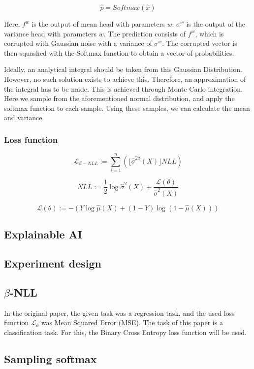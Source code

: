 \begin{equation}
    \hat{p} = Softmax(\hat{x})
\end{equation}

Here, $f^w$ is the output of mean head with parameters $w$. $\sigma^w$ is the output of the variance head with parameters $w$. The prediction consists of $f^w$, which is corrupted with Gaussian noise with a variance of $\sigma^w$. The corrupted vector is then squashed with the Softmax function to obtain a vector of probabilities.

Ideally, an analytical integral should be taken from this Gaussian Distribution. However, no such solution exists to achieve this. Therefore, an approximation of the integral has to be made. This is achieved through Monte Carlo integration. Here we sample from the aforementioned normal distribution, and apply the softmax function to each sample. Using these samples, we can calculate the mean and variance.


\subsubsection{Loss function}



\begin{equation}
    \mathcal{L}_{\beta-NLL} := \sum_{i = 1}^{n} \left( \lfloor \hat{\sigma}^{2\beta}(X) \rfloor NLL \right)
\end{equation}

\begin{equation}
    NLL := \frac{1}{2}\log \hat{\sigma}^2(X) + \frac{\mathcal{L}(\theta)}{\hat{\sigma}^2(X)}
\end{equation}

\begin{equation}
    \mathcal{L}(\theta) := - ( Y \log \hat{\mu}(X) + (1 - Y) \log (1 - \hat{\mu}(X)) )
\end{equation}

\subsection{Explainable AI}

\subsection{Experiment design}




\subsection{$\beta$-NLL}

In the original paper, the given task was a regression task, and the used loss function $\mathcal{L_{\theta}}$ was Mean Squared Error (MSE). The task of this paper is a classification task. For this, the Binary Cross Entropy loss function will be used.

\subsection{Sampling softmax}